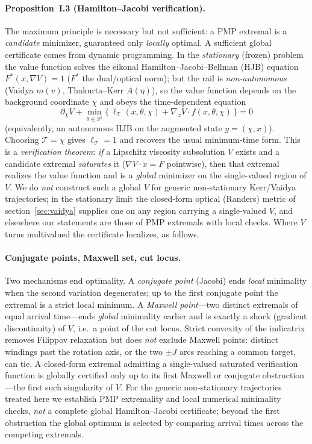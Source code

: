 \documentclass[12pt]{iopart}
\begin{document}
\paragraph{Proposition~I.3 (Hamilton--Jacobi verification).} The maximum
principle is necessary but not sufficient: a PMP extremal is a \emph{candidate}
minimizer, guaranteed only \emph{locally} optimal. A sufficient global certificate
comes from dynamic programming. In the \emph{stationary} (frozen) problem the value
function solves the eikonal Hamilton--Jacobi--Bellman (HJB) equation
$F^\ast(x,\nabla V)=1$ ($F^\ast$ the dual/optical norm); but the rail is
\emph{non-autonomous} (Vaidya $m(v)$, Thakurta--Kerr $A(\eta)$), so the value function
depends on the background coordinate $\chi$ and obeys the time-dependent equation
\begin{equation}
  \partial_\chi V+\min_{\theta\in S^1}\big\{\,\ell_{\mathcal T}(x,\theta,\chi)
  +\nabla_x V\cdot f(x,\theta,\chi)\,\big\}=0
  \label{eq:hjb}
\end{equation}
(equivalently, an autonomous HJB on the augmented state $y=(\chi,x)$). Choosing
$\mathcal T=\chi$ gives $\ell_{\mathcal T}=1$ and recovers the usual minimum-time form.
This is a
\emph{verification theorem}: \emph{if} a Lipschitz viscosity subsolution $V$ exists
and a candidate extremal \emph{saturates} it ($\nabla V\cdot\dot x=F$ pointwise), then
that extremal realizes the value function and is a \emph{global} minimizer on the
single-valued region of $V$. We do \emph{not} construct such a global $V$ for generic
non-stationary Kerr/Vaidya trajectories; in the stationary limit the closed-form
optical (Randers) metric of section~\ref{sec:vaidya} supplies one on
any region carrying a single-valued $V$, and elsewhere our statements are those of PMP
extremals with local checks. Where $V$ turns multivalued the certificate localizes, as
follows.

\paragraph{Conjugate points, Maxwell set, cut locus.} Two mechanisms end
optimality. A \emph{conjugate point} (Jacobi) ends \emph{local} minimality when
the second variation degenerates; up to the first conjugate point the extremal is
a strict local minimum. A \emph{Maxwell point}---two distinct extremals of equal
arrival time---ends \emph{global} minimality earlier and is exactly a shock
(gradient discontinuity) of $V$, i.e.\ a point of the cut locus. Strict convexity
of the indicatrix removes Filippov relaxation but does \emph{not} exclude Maxwell
points: distinct windings past the rotation axis, or the two $\pm J$ arcs reaching
a common target, can tie. A closed-form extremal admitting a single-valued saturated
verification function is globally certified only up to its first Maxwell or conjugate
obstruction---the first such singularity of $V$. For the generic non-stationary
trajectories treated here we establish PMP extremality and local numerical minimality
checks, \emph{not} a complete global Hamilton--Jacobi certificate; beyond the first
obstruction the global optimum is selected by comparing arrival times across the competing
extremals.
\end{document}
